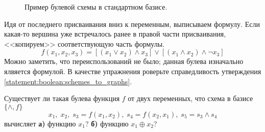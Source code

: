 \begin{figure}[ht!]
    \center
    \caption{Пример булевой схемы в стандартном базисе.}
    \label{fig:boolean:scheme_example}
\end{figure}

\begin{Answer}
    \noindent
    Идя от последнего присваивания вниз к переменным, выписываем формулу.
    Если какая-то вершина уже встречалось ранее в правой части присваивания,
    <<копируем>> соответствующую часть формулы.
    \[
        f(x_1, x_2, x_3) = \left[ (x_1 \vee x_2) \wedge x_3 \right] \vee \left[ (x_1 \wedge x_2) \wedge \neg x_3 \right]
    \]
    Можно заметить, что переиспользований не было;
    данная булева изначально ялвяется формулой.
    В качестве упражнения роверьте справедливость утверждения \ref{statement:boolean:schemes_to_graphs}.
\end{Answer}


\begin{Exercise}[counter=SecExercise, label={exercise:boolean:f_existance}]
    \noindent
    Существует ли такая булева функция $ f $ от двух переменных,
    что схема в базисе $ \{\wedge, f \} $
    \[
        x_1, \; x_2, \; s_3 = f(x_1, x_2), \; s_4 = f(x_2, x_1), \; s_5 = s_3 \wedge s_4
    \]
    вычисляет \textbf{а)} функцию $ x_1 $? \textbf{б)} функцию $ x_1 \oplus x_2 $?
\end{Exercise}

